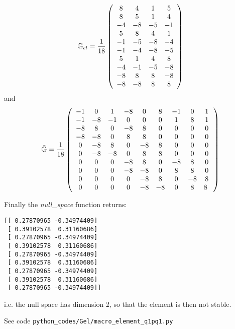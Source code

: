 \[
{\mathbb{G}}_{el}=
\frac{1}{18}
\left(
\begin{array}{cccc}
 8&  4&  1&  5\\
 8&  5&  1&  4\\
-4& -8& -5& -1\\
 5&  8&  4&  1\\
-1& -5& -8& -4\\
-1& -4& -8& -5\\
 5&  1&  4&  8\\
-4& -1& -5& -8\\
-8&  8&  8& -8\\
-8& -8&  8&  8
\end{array}
\right)
\]
and 
\[
\tilde{{\mathbb{G}}}
=
\frac{1}{18}
\left(
\begin{array}{ccccccccc}
 -1  &   0 &   1 &  -8 &   0 &    8 &  -1 &   0 &   1 \\ 
 -1  &  -8 &  -1 &   0 &   0 &    0 &   1 &   8 &   1 \\ 
 -8  &   8 &   0 &  -8 &   8 &    0 &   0 &   0 &   0 \\ 
 -8  &  -8 &   0 &   8 &   8 &    0 &   0 &   0 &   0 \\ 
  0  &  -8 &   8 &   0 &  -8 &    8 &   0 &   0 &   0 \\ 
  0  &  -8 &  -8 &   0 &   8 &    8 &   0 &   0 &   0 \\ 
  0  &   0 &   0 &  -8 &   8 &    0 &  -8 &   8 &   0 \\ 
  0  &   0 &   0 &  -8 &  -8 &    0 &   8 &   8 &   0 \\ 
  0  &   0 &   0 &   0 &  -8 &    8 &   0 &  -8 &   8 \\ 
  0  &   0 &   0 &   0 &  -8 &   -8 &   0 &   8 &   8 \
\end{array}
\right)
\]




Finally the {\sl null\_space} function returns:
\begin{verbatim}
[[ 0.27870965 -0.34974409]
 [ 0.39102578  0.31160686]
 [ 0.27870965 -0.34974409]
 [ 0.39102578  0.31160686]
 [ 0.27870965 -0.34974409]
 [ 0.39102578  0.31160686]
 [ 0.27870965 -0.34974409]
 [ 0.39102578  0.31160686]
 [ 0.27870965 -0.34974409]]
\end{verbatim}
i.e. the null space has dimension 2, so that the element is then not stable. 





See code {\tt python\_codes/Gel/macro\_element\_q1pq1.py}











